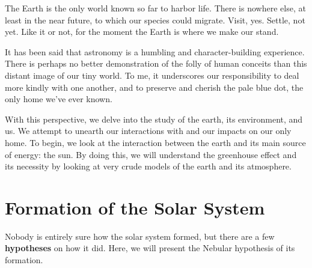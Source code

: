 \begin{displayquote}
        \quad The Earth is the only world known so far to harbor life. There is nowhere else, at least in the near future, to which our species could migrate. Visit, yes. Settle, not yet. Like it or not, for the moment the Earth is where we make our stand.

        \quad It has been said that astronomy is a humbling and character-building experience. There is perhaps no better demonstration of the folly of human conceits than this distant image of our tiny world. To me, it underscores our responsibility to deal more kindly with one another, and to preserve and cherish the pale blue dot, the only home we've ever known.\cite{sagan}
    \end{displayquote}

    With this perspective, we delve into the study of the earth, its environment, and us. We attempt to unearth our interactions with and our impacts on our only home. To begin, we look at the interaction between the earth and its main source of energy: the sun. By doing this, we will understand the greenhouse effect and its necessity by looking at very crude models of the earth and its atmosphere. 


    \section{\label{sec:solar_sys}Formation of the Solar System}

    Nobody is entirely sure how the solar system formed, but there are a few \textbf{hypotheses} on how it did. Here, we will present the Nebular hypothesis of its formation.

